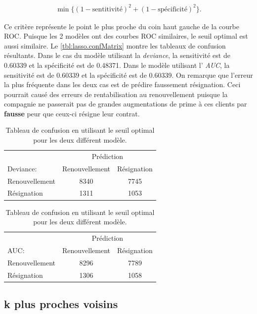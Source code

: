\documentclass[]{article}
\begin{document}
\begin{align}
    \min\{ (1-\text{sentitivité})^2 + (1-\text{spécificité})^2 \}.
\end{align}

Ce critère représente le point le plus proche du coin haut gauche de la
courbe ROC. Puisque les 2 modèles ont des courbes ROC similaires, le
seuil optimal est aussi similaire. Le \autoref{tbl:lasso.confMatrix}
montre les tableaux de confusion résultants. Dans le cas du modèle
utilisant la \emph{deviance}, la sensitivité est de 0.60339 et la
spécificité est de 0.48371. Dans le modèle utilisant l' \emph{AUC}, la
sensitivité est de 0.60339 et la spécificité est de 0.60339. On remarque
que l'erreur la plus fréquente dans les deux cas est de prédire
faussement résignation. Ceci pourrait causé des erreurs de
rentabilisation au renouvellement puisque la compagnie ne passerait pas
de grandes augmentations de prime à ces clients par \textbf{fausse} peur
que ceux-ci résigne leur contrat.

\begin{table}[!hb]
\centering
\caption{Tableau de confusion en utilisant le seuil optimal pour les deux 
différent modèle.}
\label{tbl:lasso.confMatrix}
\begin{minipage}{0.48\linewidth}
\begin{tabular}{l|cc}
\multicolumn{1}{c}{} & \multicolumn{2}{c}{Prédiction} \\
Deviance: & Renouvellement & Résignation \\
\hline
Renouvellement & 8340 & 7745 \\
Résignation    & 1311 & 1053 \\
\hline
\end{tabular}
\end{minipage}
\hfill
\begin{minipage}{0.48\linewidth}
\begin{tabular}{l|cc}
\multicolumn{1}{c}{} & \multicolumn{2}{c}{Prédiction} \\
AUC: & Renouvellement & Résignation \\
\hline
Renouvellement & 8296 & 7789 \\
Résignation    & 1306 & 1058 \\
\hline
\end{tabular}
\end{minipage}
\end{table}

\newpage

\subsection{k plus proches voisins}\label{k-plus-proches-voisins}
\end{document}

